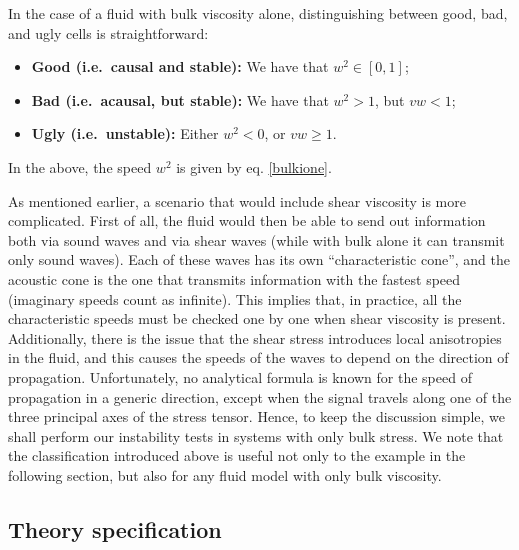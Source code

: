 \documentclass[aps, prd, showkeys,superscriptaddress, nofootinbib,floatfix]{revtex4-2}
\begin{document}
In the case of a fluid with bulk viscosity alone, distinguishing between good, bad, and ugly cells is straightforward:
\begin{itemize}
\item \textbf{Good (i.e.~causal and stable):} We have that $w^2 \in [0,1]$;
\item  \textbf{Bad (i.e.~acausal, but stable):} We have that $w^2>1$, but $vw<1$;
\item \textbf{Ugly (i.e.~unstable):} Either $w^2<0$, or $vw\geq 1$.
\end{itemize}
In the above, the speed $w^2$ is given by eq. \eqref{bulkione}. 

As mentioned earlier, a scenario that would include shear viscosity is more complicated. First of all, the fluid would then be able to send out information both via sound waves and via shear waves (while with bulk alone it can transmit only sound waves). Each of these waves has its own ``characteristic cone'', and the acoustic cone is the one that transmits information with the fastest speed (imaginary speeds count as infinite). This implies that, in practice, all the characteristic speeds must be checked one by one when shear viscosity is present. Additionally, there is the issue that the shear stress introduces local anisotropies in the fluid, and this causes the speeds of the waves to depend on the direction of propagation. Unfortunately, no analytical formula is known for the speed of propagation in a generic direction, except when the signal travels along one of the three principal axes of the stress tensor. Hence, to keep the discussion simple, we shall perform our instability tests in systems with only bulk stress. We note that the classification introduced above is useful not only to the example in the following section, but also for any fluid model with only bulk viscosity.




\subsection{Theory specification}
\end{document}
